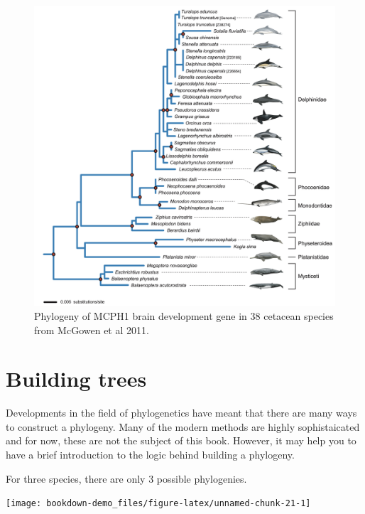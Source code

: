 \documentclass[
]{book}
\begin{document}
\begin{figure}[H]

{\centering \includegraphics[width=64.9in]{Images/whales} 

}

\caption{Phylogeny of MCPH1 brain development gene in 38 cetacean species from McGowen et al 2011.}\label{fig:unnamed-chunk-20}
\end{figure}

\hypertarget{building-trees}{%
\section{Building trees}\label{building-trees}}

Developments in the field of phylogenetics have meant that there are many ways to construct a phylogeny. Many of the modern methods are highly sophistaicated and for now, these are not the subject of this book. However, it may help you to have a brief introduction to the logic behind building a phylogeny.

For three species, there are only 3 possible phylogenies.

\begin{center}\texttt{[image: bookdown-demo\_files/figure-latex/unnamed-chunk-21-1]} \end{center}
\end{document}
